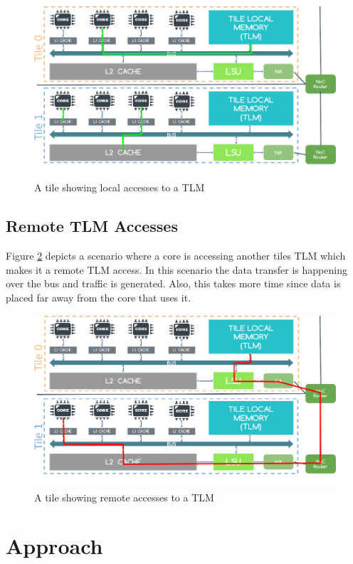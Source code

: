 \documentclass{listhesis}
\begin{document}
\begin{figure}
  \includegraphics[width=\linewidth]{localaccesses.png}
  \centering
  \caption{A tile showing local accesses to a TLM}
  \label{fig:localaccesses}
\end{figure}
\section{Remote TLM Accesses}
Figure \ref{fig:remoteaccesses} depicts a scenario where a core is accessing another tiles TLM which makes it a remote TLM access. In this scenario the data transfer is happening over the bus and traffic is generated. Also, this takes more time since data is placed far away from the core that uses it. 

\begin{figure}
  \includegraphics[width=\linewidth]{remoteaccesses.png}
  \centering
  \caption{A tile showing remote accesses to a TLM}
  \label{fig:remoteaccesses}
\end{figure}
\chapter{Approach}
\end{document}
